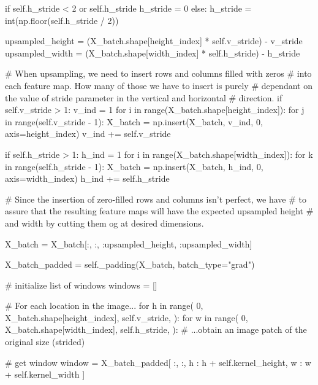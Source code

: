 \documentclass[%
oneside,                 %
final,                   %
10pt]{article}
\begin{document}
            if self.h_stride < 2 or self.h_stride %
                h_stride = 0
            else:
                h_stride = int(np.floor(self.h_stride / 2))

            upsampled_height = (X_batch.shape[height_index] * self.v_stride) - v_stride
            upsampled_width = (X_batch.shape[width_index] * self.h_stride) - h_stride

            # When upsampling, we need to insert rows and columns filled with zeros
            # into each feature map. How many of those we have to insert is purely
            # dependant on the value of stride parameter in the vertical and horizontal
            # direction.
            if self.v_stride > 1:
                v_ind = 1
                for i in range(X_batch.shape[height_index]):
                    for j in range(self.v_stride - 1):
                        X_batch = np.insert(X_batch, v_ind, 0, axis=height_index)
                    v_ind += self.v_stride

            if self.h_stride > 1:
                h_ind = 1
                for i in range(X_batch.shape[width_index]):
                    for k in range(self.h_stride - 1):
                        X_batch = np.insert(X_batch, h_ind, 0, axis=width_index)
                    h_ind += self.h_stride

            # Since the insertion of zero-filled rows and columns isn't perfect, we have
            # to assure that the resulting feature maps will have the expected upsampled height
            # and width by cutting them og at desired dimensions.

            X_batch = X_batch[:, :, :upsampled_height, :upsampled_width]

            X_batch_padded = self._padding(X_batch, batch_type="grad")

            # initialize list of windows
            windows = []

            # For each location in the image...
            for h in range(
                0,
                X_batch.shape[height_index],
                self.v_stride,
            ):
                for w in range(
                    0,
                    X_batch.shape[width_index],
                    self.h_stride,
                ):
                    # ...obtain an image patch of the original size (strided)

                    # get window
                    window = X_batch_padded[
                        :, :, h : h + self.kernel_height, w : w + self.kernel_width
                    ]
\end{document}
